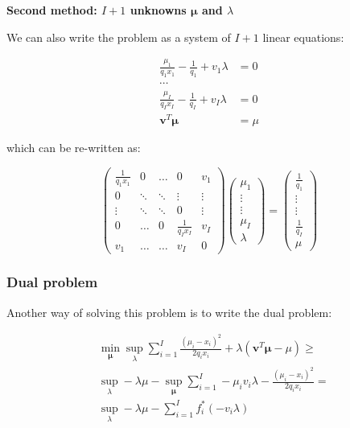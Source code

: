 \documentclass{tex/note}
\begin{document}
\textbf{Second method: $I + 1$ unknowns $\bm{\mu}$ and $\lambda$}

We can also write the problem as a system of $I + 1$ linear equations:

\begin{align*}
\frac{\mu_1}{q_1 x_1} - \frac{1}{q_1} + v_1 \lambda &= 0 \\
\cdots & \\
\frac{\mu_I}{q_I x_I} - \frac{1}{q_I} + v_I \lambda &= 0 \\
\bm{v}^T \bm{\mu} &= \mu
\end{align*}

which can be re-written as:

\begin{equation*}
\begin{pmatrix} \frac{1}{q_1 x_1} & 0 & \hdots & 0 & v_1 \\ 0 & \ddots & \ddots & \vdots & \vdots \\ \vdots & \ddots & \ddots & 0 & \vdots \\ 0 & \hdots & 0 & \frac{1}{q_I x_I} & v_I \\ v_1 & \hdots & \hdots & v_I & 0 \end{pmatrix} \begin{pmatrix} \mu_1 \\ \vdots \\ \vdots \\ \mu_I \\ \lambda \end{pmatrix} = \begin{pmatrix} \frac{1}{q_1} \\ \vdots \\ \vdots \\ \frac{1}{q_I} \\ \mu \end{pmatrix}
\end{equation*}

\subsubsection{Dual problem}

Another way of solving this problem is to write the dual problem:

\begin{align*}
& \min_{\bm{\mu}} \sup_{\lambda} \sum_{i = 1}^I \frac{\left( \mu_i - x_i \right)^2}{2 q_i x_i} + \lambda \left( \bm{v}^T \bm{\mu} - \mu \right) \geq \\
& \sup_{\lambda} - \lambda \mu - \sup_{\bm{\mu}} \sum_{i = 1}^I - \mu_i v_i \lambda - \frac{\left( \mu_i - x_i \right)^2}{2 q_i x_i} = \\
& \sup_{\lambda} - \lambda \mu - \sum_{i = 1}^I f_i^* \left( - v_i \lambda \right)
\end{align*}
\end{document}
